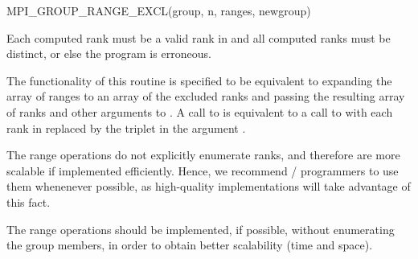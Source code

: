 %
\begin{funcdef}{MPI\_GROUP\_RANGE\_EXCL}{(\mbox{group}, \mbox{n}, \mbox{ranges}, \mbox{newgroup})}
\end{funcdef}

\noindent Each computed rank must be a valid
rank in  and all computed ranks must be distinct, or else the
program is erroneous.

The functionality of this routine is specified to be equivalent to
expanding the array of ranges to an array of the excluded ranks and
passing the resulting array of ranks and other arguments to
. A call to  is
equivalent to a call to  with each rank
 in  replaced by the triplet  in the argument
.

\begin{users}
The range operations do not explicitly enumerate ranks, and therefore
are more scalable if implemented efficiently. Hence, we recommend \MPI/ programmers
to use them whenenever possible, as high-quality implementations will
take advantage of this fact.
\end{users}

\begin{implementors}
The range operations should be implemented, if possible, without
enumerating the group members,
in order to obtain better scalability (time and space).
\end{implementors}

